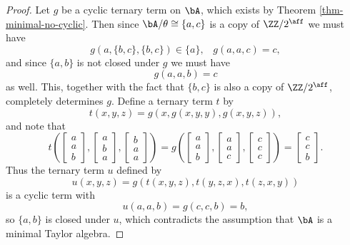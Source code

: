 \begin{proof}
Let $g$ be a cyclic ternary term on $\bA$, which exists by Theorem \ref{thm-minimal-no-cyclic}. Then since $\bA/\theta \cong \{a,c\}$ is a copy of $\ZZ/2^{\aff}$ we must have
\[
g(a,\{b,c\},\{b,c\}) \in \{a\}, \;\;\; g(a,a,c) = c,
\]
and since $\{a,b\}$ is not closed under $g$ we must have
\[
g(a,a,b) = c
\]
as well. This, together with the fact that $\{b,c\}$ is also a copy of $\ZZ/2^{\aff}$, completely determines $g$. Define a ternary term $t$ by
\[
t(x,y,z) = g(x,g(x,y,y),g(x,y,z)),
\]
and note that
\[
t\left(\begin{bmatrix}a\\a\\b\end{bmatrix},\begin{bmatrix}a\\b\\a\end{bmatrix},\begin{bmatrix}b\\a\\a\end{bmatrix}\right) = g\left(\begin{bmatrix}a\\a\\b\end{bmatrix},\begin{bmatrix}a\\a\\c\end{bmatrix},\begin{bmatrix}c\\c\\c\end{bmatrix}\right) = \begin{bmatrix}c\\c\\b\end{bmatrix}.
\]
Thus the ternary term $u$ defined by
\[
u(x,y,z) = g(t(x,y,z), t(y,z,x), t(z,x,y))
\]
is a cyclic term with
\[
u(a,a,b) = g(c,c,b) = b,
\]
so $\{a,b\}$ is closed under $u$, which contradicts the assumption that $\bA$ is a minimal Taylor algebra.
\end{proof}

